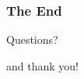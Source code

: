 \documentclass{beamer} %
\theoremstyle{definition} %
\begin{document}
\begin{frame}

\frametitle{The End}

\begin{center}
\huge{Questions?}

\small{and thank you!}
\end{center}

\end{frame}
\end{document}
